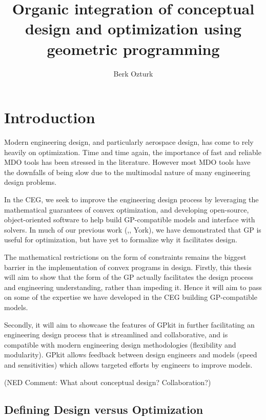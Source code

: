 \documentclass{aiaa-pretty}
\begin{document}
\title{Organic integration of conceptual design and optimization using geometric programming}
\author{Berk Ozturk}
\maketitle

\section{\bf Introduction}

Modern engineering design, and particularly aerospace design, has come to rely heavily on optimization. Time and time again, the importance of fast and reliable MDO tools has been stressed in the literature. However most MDO tools have the downfalls of being slow due to the multimodal nature of many engineering design problems.  
	
In the \gls{CEG}, we seek to improve the engineering design process by leveraging the mathematical guarantees of convex optimization, and developing open-source, object-oriented software to help build GP-compatible models and interface with solvers. In much of our previous work (\cite{gp_ac_design},\cite{SP_ac_design}, York), we have demonstrated that \gls{GP} is useful for optimization, but have yet to formalize why it facilitates design. 
 
The mathematical restrictions on the form of constraints remains the biggest barrier in the implementation of convex programs in design. Firstly, this thesis will aim to show that the form of the GP actually facilitates the design process and engineering understanding, rather than impeding it. Hence it will aim to pass on some of the expertise we have developed in the \gls{CEG} building \gls{GP}-compatible models. 

Secondly, it will aim to showcase the features of GPkit in further facilitating an engineering design process that is streamlined and collaborative, and is compatible with modern engineering design methodologies (flexibility and modularity). GPkit allows feedback between design engineers and models (speed and sensitivities) which allows targeted efforts by engineers to improve models. 

(NED Comment: What about conceptual design? Collaboration?)

\subsection{Defining Design versus Optimization}
\end{document}
